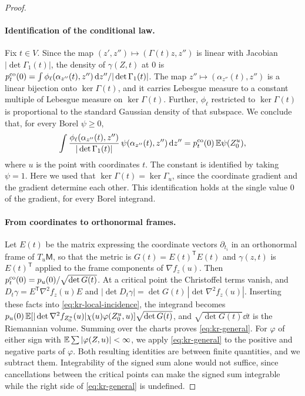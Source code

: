 \begin{proof}
\paragraph{Identification of the conditional law.}
Fix $t\in V$. Since the map $(z',z'')\mapsto(\Gamma(t)z,z'')$ is linear with Jacobian $|\det\Gamma_1(t)|$, the density of $\gamma(Z,t)$ at $0$ is $p^{\rm co}_t(0)=\int\phi_\ell(\alpha_{z''}(t),z'')\,\mathrm d z''/|\det\Gamma_1(t)|$. The map $z''\mapsto(\alpha_{z''}(t),z'')$ is a linear bijection onto $\ker\Gamma(t)$, and it carries Lebesgue measure to a constant multiple of Lebesgue measure on $\ker\Gamma(t)$. Further, $\phi_\ell$ restricted to $\ker\Gamma(t)$ is proportional to the standard Gaussian density of that subspace. We conclude that, for every Borel $\psi\ge0$,
\[
\int\frac{\phi_\ell(\alpha_{z''}(t),z'')}{|\det\Gamma_1(t)|}\,\psi(\alpha_{z''}(t),z'')\,\mathrm d z''=p^{\rm co}_t(0)\,\mathbb E\psi(Z^u_0),
\]
where $u$ is the point with coordinates $t$. The constant is identified by taking $\psi=1$. Here we used that $\ker\Gamma(t)=\ker\Gamma_u$, since the coordinate gradient and the gradient determine each other. This identification holds at the single value $0$ of the gradient, for every Borel integrand.

\paragraph{From coordinates to orthonormal frames.}
Let $E(t)$ be the matrix expressing the coordinate vectors $\partial_{t_i}$ in an orthonormal frame of $T_u\mathsf M$, so that the metric is $G(t)=E(t)^{\mathsf T}E(t)$ and $\gamma(z,t)$ is $E(t)^{\mathsf T}$ applied to the frame components of $\nabla f_z(u)$. Then $p^{\rm co}_t(0)=p_u(0)/\sqrt{\det G(t)}$. At a critical point the Christoffel terms vanish, and $D_t\gamma=E^{\mathsf T}\nabla^2f_z(u)E$ and $|\det D_t\gamma|=\det G(t)\,|\det\nabla^2f_z(u)|$. Inserting these facts into \eqref{eq:kr-local-incidence}, the integrand becomes $p_u(0)\,\mathbb E[|\det\nabla^2f_{Z^u_0}(u)|\chi(u)\varphi(Z^u_0,u)]\sqrt{\det G(t)}$, and $\sqrt{\det G(t)}\dd t$ is the Riemannian volume. Summing over the charts proves \eqref{eq:kr-general}. For $\varphi$ of either sign with $\mathbb E\sum|\varphi(Z,u)|<\infty$, we apply \eqref{eq:kr-general} to the positive and negative parts of $\varphi$. Both resulting identities are between finite quantities, and we subtract them. Integrability of the signed sum alone would not suffice, since cancellations between the critical points can make the signed sum integrable while the right side of \eqref{eq:kr-general} is undefined.
\end{proof}

